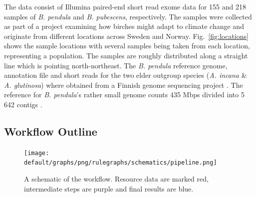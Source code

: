 \documentclass[hidelinks,11pt]{article}
\newcommand{\pendula}{\textit{B. pendula}}
\newcommand{\pubescens}{\textit{B. pubescens}}
\newcommand{\incana}{\textit{A. incana}}
\newcommand{\glutinosa}{\textit{A. glutinosa}}
\begin{document}
{    The data consist of Illumina paired-end short read exome data for 155 and 218 samples of \pendula{} and \pubescens{}, respectively. The samples were collected as part of a project examining how birches might adapt to climate change and originate from different locations across Sweden and Norway. Fig.~\ref{fig:locations} shows the sample locations with several samples being taken from each location, representing a population. The samples are roughly distributed along a straight line which is pointing north-northeast. The \pendula{} reference genome, annotation file and short reads for the two elder outgroup species (\incana{} \& \glutinosa{}) where obtained from a Finnish genome sequencing project \cite{jarkko}. The reference for \pendula{}'s rather small genome counts 435 Mbps divided into 5\,642 contigs \cite{ref-genome}.

    \subsection{Workflow Outline}
    \label{sec:workflow-outline}

    \begin{figure}[ht]
        \centering
        \texttt{[image: default/graphs/png/rulegraphs/schematics/pipeline.png]}
        \caption{A schematic of the workflow. Resource data are marked red, intermediate steps are purple and final results are blue.}
        \label{fig:workflow_schematic}
    \end{figure}

}
\end{document}
